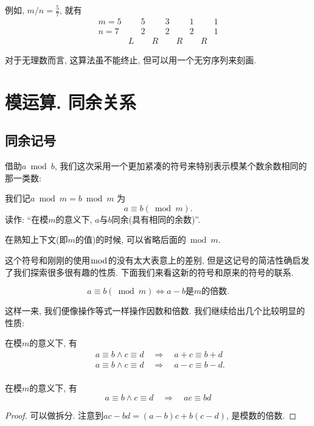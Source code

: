 \documentclass{ctexart}
\begin{document}
例如, $m / n=\frac{5}{7}$, 就有
\[
    \begin{array}{lllllllcc}
m=5 &  & 5 &  & 3 &  & 1 &  & 1\\
n=7 &  & 2 &  & 2 &  & 2 &  & 1\\
 & L &  & R &  & R &  & R
\end{array}
\]

对于无理数而言, 这算法虽不能终止, 但可以用一个无穷序列来刻画. 

\section{模运算. 同余关系}

\subsection{同余记号} 借助$a \bmod b$, 我们这次采用一个更加紧凑的符号来特别表示模某个数余数相同的那一类数: 

\begin{definition}我们记$a \bmod m = b \bmod m$ 为
    \[
        a \equiv b (\bmod m).
    \]
    读作: ``在模$m$的意义下, $a$与$b$同余(具有相同的余数)''. 
    
\end{definition}

在熟知上下文(即$m$的值)的时候, 可以省略后面的$\bmod m$. 

这个符号和刚刚的使用$\bmod$的没有太大表意上的差别, 但是这记号的简洁性确启发了我们探索很多很有趣的性质. 下面我们来看这新的符号和原来的符号的联系. 

\begin{prop}
    \[
        a \equiv b (\bmod m) \iff \text{$a-b$是$m$的倍数}.
    \]
    
\end{prop}

这样一来, 我们便像操作等式一样操作因数和倍数. 我们继续给出几个比较明显的性质:

\begin{prop}
    在模$m$的意义下, 有
    $$
\begin{aligned}
& a \equiv b \wedge c \equiv d \quad \Rightarrow \quad a+c \equiv b+d \\
& a \equiv b \wedge  c \equiv d \quad \Rightarrow \quad a-c \equiv b-d \text {. } \\
&
\end{aligned}
$$
    
\end{prop}

\begin{prop}
    在模$m$的意义下, 有
    $$
a \equiv b \wedge  c \equiv d \quad \Rightarrow \quad a c \equiv b d
$$
\end{prop}
\begin{proof}
    可以做拆分. 注意到$a c-b d=(a-b) c+b(c-d)$, 是模数的倍数. 
\end{proof}
\end{document}
